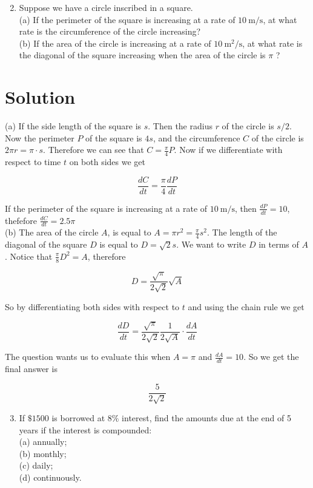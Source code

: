 \documentclass[10pt]{article}
\begin{document}
\begin{enumerate}
  \setcounter{enumi}{1}
  \item Suppose we have a circle inscribed in a square.\\
(a) If the perimeter of the square is increasing at a rate of $10 \mathrm{~m} / \mathrm{s}$, at what rate is the circumference of the circle increasing?\\
(b) If the area of the circle is increasing at a rate of $10 \mathrm{~m}^{2} / \mathrm{s}$, at what rate is the diagonal of the square increasing when the area of the circle is $\pi$ ?
\end{enumerate}

\section*{Solution}
(a) If the side length of the square is $s$. Then the radius $r$ of the circle is $s / 2$. Now the perimeter $P$ of the square is $4 s$, and the circumference $C$ of the circle is $2 \pi r=\pi \cdot s$. Therefore we can see that $C=\frac{\pi}{4} P$. Now if we differentiate with respect to time $t$ on both sides we get

$$
\frac{d C}{d t}=\frac{\pi}{4} \frac{d P}{d t}
$$

If the perimeter of the square is increasing at a rate of $10 \mathrm{~m} / \mathrm{s}$, then $\frac{d P}{d t}=10$, thefefore $\frac{d C}{d t}=2.5 \pi$\\
(b) The area of the circle $A$, is equal to $A=\pi r^{2}=\frac{\pi}{4} s^{2}$. The length of the diagonal of the square $D$ is equal to $D=\sqrt{2} s$. We want to write $D$ in terms of $A$. Notice that $\frac{\pi}{8} D^{2}=A$, therefore

$$
D=\frac{\sqrt{\pi}}{2 \sqrt{2}} \sqrt{A}
$$

So by differentiating both sides with respect to $t$ and using the chain rule we get

$$
\frac{d D}{d t}=\frac{\sqrt{\pi}}{2 \sqrt{2}} \frac{1}{2 \sqrt{A}} \cdot \frac{d A}{d t}
$$

The question wants us to evaluate this when $A=\pi$ and $\frac{d A}{d t}=10$. So we get the final answer is

$$
\frac{5}{2 \sqrt{2}}
$$

\begin{enumerate}
  \setcounter{enumi}{2}
  \item If $\$ 1500$ is borrowed at $8 \%$ interest, find the amounts due at the end of 5 years if the interest is compounded:\\
(a) annually;\\
(b) monthly;\\
(c) daily;\\
(d) continuously.
\end{enumerate}
\end{document}
